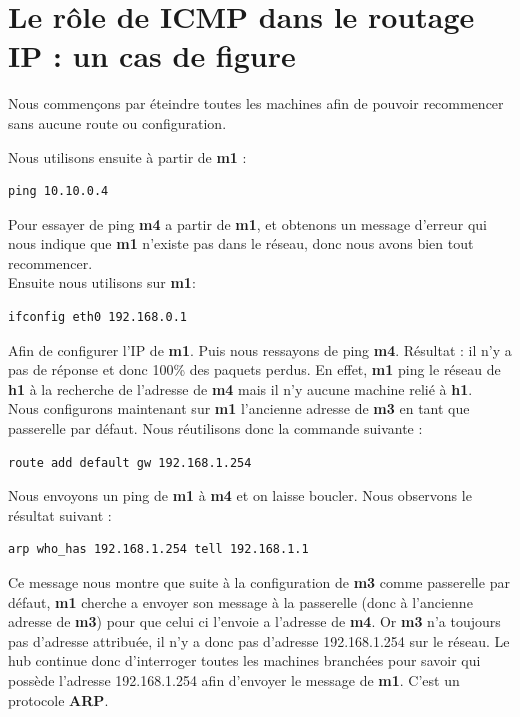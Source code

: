 \documentclass{article}
\begin{document}
\section{Le rôle de ICMP dans le routage IP : un cas de figure}

Nous commençons par éteindre toutes les machines afin de pouvoir recommencer sans aucune route ou configuration.

Nous utilisons ensuite à partir de \textbf{m1} :
\begin{verbatim}
ping 10.10.0.4 
\end{verbatim}

Pour essayer de ping \textbf{m4} a partir de \textbf{m1}, et obtenons un message d'erreur qui nous indique que \textbf{m1} n'existe pas dans le réseau, donc nous avons bien tout recommencer. \\

Ensuite nous utilisons sur \textbf{m1}:
\begin{verbatim}
ifconfig eth0 192.168.0.1
\end{verbatim}

Afin de configurer l'IP de \textbf{m1}. Puis nous ressayons de ping \textbf{m4}. Résultat : il n'y a pas de réponse et donc 100\% des paquets perdus. En effet, \textbf{m1} ping le réseau de \textbf{h1} à la recherche de l'adresse de \textbf{m4} mais il n'y aucune machine relié à \textbf{h1}. \\

Nous configurons maintenant sur \textbf{m1} l'ancienne adresse de \textbf{m3} en tant que passerelle par défaut. Nous réutilisons donc la commande suivante : 
\begin{verbatim}
route add default gw 192.168.1.254
\end{verbatim}

Nous envoyons un ping de \textbf{m1} à \textbf{m4} et on laisse boucler. Nous observons le résultat suivant : 
\begin{verbatim}
arp who_has 192.168.1.254 tell 192.168.1.1
\end{verbatim}

Ce message nous montre que suite à la configuration de \textbf{m3} comme passerelle par défaut, \textbf{m1} cherche a envoyer son message à la passerelle (donc à l'ancienne adresse de \textbf{m3}) pour que celui ci l'envoie a l'adresse de \textbf{m4}. Or \textbf{m3} n'a toujours pas d'adresse attribuée, il n'y a donc pas d'adresse 192.168.1.254 sur le réseau. Le hub continue donc d'interroger toutes les machines branchées pour savoir qui possède l'adresse 192.168.1.254 afin d'envoyer le message de \textbf{m1}. C'est un protocole \textbf{ARP}.
\end{document}
